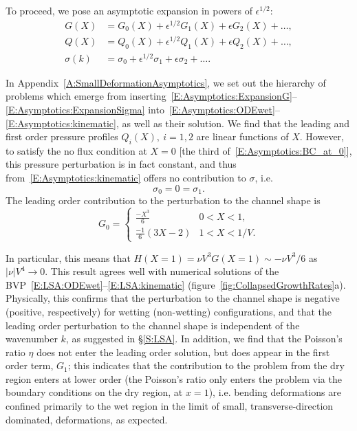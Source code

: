 \documentclass{jfm}
\newcommand{\poisson}{\eta} %
\begin{document}
To proceed, we pose an asymptotic expansion in powers of $\epsilon^{1/2}$:
\begin{align}
G(X) &=    G_0(X) + \epsilon^{1/2} G_1(X) + \epsilon G_2(X)+ \dots,\label{E:Asymptotics:ExpansionG} \\
Q(X) &=  Q_0(X) + \epsilon^{1/2} Q_1(X) + \epsilon Q_2(X)+\dots,\label{E:Asymptotics:ExpansionQ} \\
\sigma(k) &= \sigma_0 + \epsilon^{1/2} \sigma_1 + \epsilon \sigma_2+ \dots. \label{E:Asymptotics:ExpansionSigma}
\end{align}

In Appendix~\ref{A:SmallDeformationAsymptotics}, we set out the hierarchy of problems which emerge from inserting~\eqref{E:Asymptotics:ExpansionG}--\eqref{E:Asymptotics:ExpansionSigma} into~\eqref{E:Asymptotics:ODEwet}--\eqref{E:Asymptotics:kinematic}, as well as their solution.  We find that the leading and first order pressure profiles $Q_i(X),~i = 1,2$ are linear functions of $X$. However, to satisfy the no flux condition at $X =0$ [the third of~\eqref{E:Asymptotics:BC_at_0}], this pressure perturbation is in fact constant, and thus from~\eqref{E:Asymptotics:kinematic} offers no contribution to $\sigma$, i.e.
\begin{equation}
\sigma_{0} = 0 = \sigma_{1}.
\end{equation}
The leading order contribution to the perturbation to the channel shape is
\begin{equation}\label{E:Asymptotics:ChannelShapeSolution}
G_{0} =\begin{cases}
\frac{-X^3}{6} & 0 < X < 1,\\
\frac{-1}{6}(3X-2) & 1 < X < 1/V.
\end{cases}
\end{equation}

In particular, this means that $H(X=1) = \nu V^3 G(X=1)\sim -\nu V^3/6$ as $|\nu| V^4 \to 0$. This result agrees well with numerical solutions of the BVP~\eqref{E:LSA:ODEwet}--\eqref{E:LSA:kinematic} (figure~\ref{fig:CollapsedGrowthRates}a). Physically, this confirms that the perturbation to the channel shape is negative (positive, respectively) for wetting (non-wetting) configurations, and that the leading order perturbation to the channel shape is independent of the wavenumber $k$, as suggested in \S\ref{S:LSA}. In addition, we find that the Poisson's ratio $\poisson$ does not enter the leading order solution, but does appear in the first order term, $G_{1}$; this indicates that the contribution to the problem from the dry region enters at lower order (the Poisson's ratio only enters the problem via the boundary conditions on the dry region, at $x = 1$), i.e. bending deformations are confined primarily to the wet region in the limit of small, transverse-direction dominated, deformations, as expected.
\end{document}
